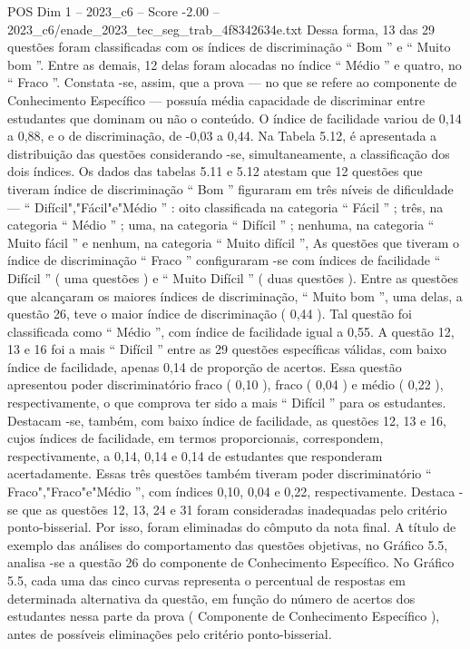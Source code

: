 \begin{textsample}{POS Dim 1 – 2023\_c6 – Score -2.00 – 2023\_c6/enade\_2023\_tec\_seg\_trab\_4f8342634e.txt}
Dessa forma, 13 das 29 questões foram classificadas com os índices de discriminação “ Bom ” e “ Muito bom ”.
Entre as demais, 12 delas foram alocadas no índice “ Médio ” e quatro, no “ Fraco ”.
Constata -se, assim, que a prova — no que se refere ao componente de Conhecimento Específico — possuía média capacidade de discriminar entre estudantes que dominam ou não o conteúdo.
O índice de facilidade variou de 0,14 a 0,88, e o de discriminação, de -0,03 a 0,44.
Na Tabela 5.12, é apresentada a distribuição das questões considerando -se, simultaneamente, a classificação dos dois índices.
Os dados das tabelas 5.11 e 5.12 atestam que 12 questões que tiveram índice de discriminação “ Bom ” figuraram em três níveis de dificuldade — “ Difícil","Fácil"e"Médio ” : oito classificada na categoria “ Fácil ” ; três, na categoria “ Médio ” ; uma, na categoria “ Difícil ” ; nenhuma, na categoria “ Muito fácil ” e nenhum, na categoria “ Muito difícil ”, As questões que tiveram o índice de discriminação “ Fraco ” configuraram -se com índices de facilidade “ Difícil ” ( uma questões ) e “ Muito Difícil ” ( duas questões ).
Entre as questões que alcançaram os maiores índices de discriminação, “ Muito bom ”, uma delas, a questão 26, teve o maior índice de discriminação ( 0,44 ).
Tal questão foi classificada como “ Médio ”, com índice de facilidade igual a 0,55.
A questão 12, 13 e 16 foi a mais “ Difícil ” entre as 29 questões específicas válidas, com baixo índice de facilidade, apenas 0,14 de proporção de acertos.
Essa questão apresentou poder discriminatório fraco ( 0,10 ), fraco ( 0,04 ) e médio ( 0,22 ), respectivamente, o que comprova ter sido a mais “ Difícil ” para os estudantes.
Destacam -se, também, com baixo índice de facilidade, as questões 12, 13 e 16, cujos índices de facilidade, em termos proporcionais, correspondem, respectivamente, a 0,14, 0,14 e 0,14 de estudantes que responderam acertadamente.
Essas três questões também tiveram poder discriminatório “ Fraco","Fraco"e"Médio ”, com índices 0,10, 0,04 e 0,22, respectivamente.
Destaca -se que as questões 12, 13, 24 e 31 foram consideradas inadequadas pelo critério ponto-bisserial.
Por isso, foram eliminadas do cômputo da nota final.
A título de exemplo das análises do comportamento das questões objetivas, no Gráfico 5.5, analisa -se a questão 26 do componente de Conhecimento Específico.
No Gráfico 5.5, cada uma das cinco curvas representa o percentual de respostas em determinada alternativa da questão, em função do número de acertos dos estudantes nessa parte da prova ( Componente de Conhecimento Específico ), antes de possíveis eliminações pelo critério ponto-bisserial.

\end{textsample}
